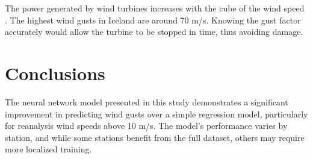The power generated by wind turbines increases with the cube of the wind speed \cite{wind_power}. The highest wind gusts in Iceland are around 70 m/s. Knowing the gust factor accurately would allow the turbine to be stopped in time, thus avoiding damage.

\section{Conclusions}
The neural network model presented in this study demonstrates a significant improvement in predicting wind gusts over a simple regression model, particularly for reanalysis wind speeds above 10 m/s. The model's performance varies by station, and while some stations benefit from the full dataset, others may require more localized training. 